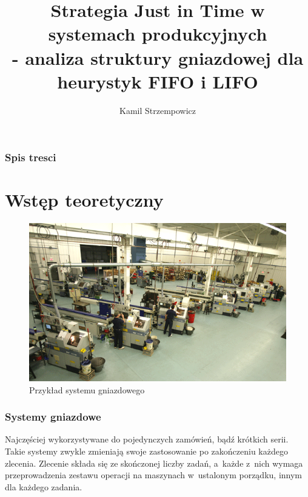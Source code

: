 \documentclass{prezentacja}
\title{Strategia Just in Time w systemach produkcyjnych\\ - analiza struktury gniazdowej dla heurystyk FIFO i LIFO}
\author{Kamil Strzempowicz}
\institute{Wydział Automatyki, Elektroniki i Informatyki}
\begin{document}
\begin{frame}
    \StronaTyt
\end{frame}
\begin{frame}
    \frametitle{Spis tresci}
    \tableofcontents
\end{frame}
\section{Wstęp teoretyczny}
\begin{frame}
    
    \begin{figure}
        \vspace{-110pt}
        \includegraphics[width=\linewidth, keepaspectratio=true]{./obrazki/job-shop}
        \caption{ Przykład systemu gniazdowego\cite{swiss}}
    \end{figure}
    
    \frametitle{Systemy gniazdowe}
    \vspace{60pt}
    Najczęściej wykorzystywane do pojedynczych zamówień, bądź krótkich serii. Takie systemy zwykle zmieniają swoje zastosowanie po zakończeniu każdego zlecenia. Zlecenie składa się ze skończonej liczby zadań, a~każde z~nich wymaga przeprowadzenia zestawu operacji na maszynach w~ustalonym porządku, innym dla każdego zadania.
    
   

\end{frame}
\end{document}
